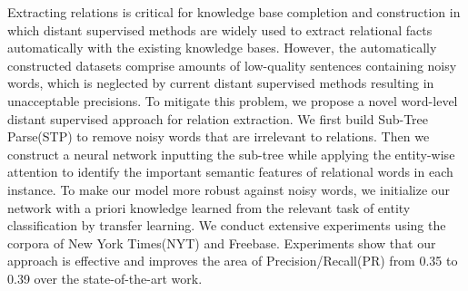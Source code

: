 Extracting relations is critical for knowledge base completion and construction in which distant supervised methods are widely used to extract relational facts automatically with the existing knowledge bases. However, the automatically constructed datasets comprise amounts of low-quality sentences containing noisy words, which is neglected by current distant supervised methods resulting in unacceptable precisions. To mitigate this problem, we propose a novel word-level distant supervised approach for relation extraction. We first build Sub-Tree Parse(STP) to remove noisy words that are irrelevant to relations. Then we construct a neural network inputting the sub-tree while applying the entity-wise attention to identify the important semantic features of relational words in each instance. To make our model more robust against noisy words, we initialize our network with a priori knowledge learned from the relevant task of entity classification by transfer learning. We conduct extensive experiments using the corpora of New York Times(NYT) and Freebase. Experiments show that our approach is effective and improves the area of Precision/Recall(PR) from 0.35 to 0.39 over the state-of-the-art work.

